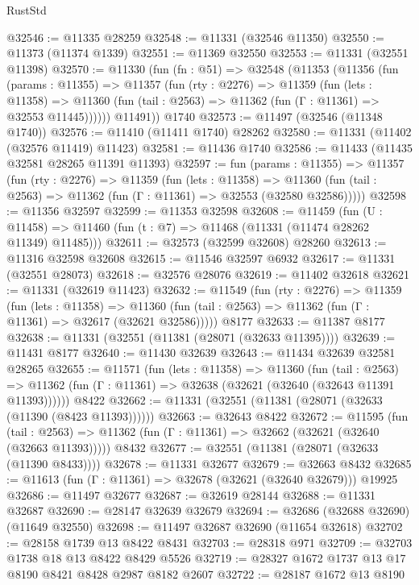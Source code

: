 \begin{lexlean}{RustStd}
\begin{coremodule}
@32546 := @11335 @28259
@32548 := @11331 (@32546 @11350)
@32550 := @11373 (@11374 @1339)
@32551 := @11369 @32550
@32553 := @11331 (@32551 @11398)
@32570 := @11330
    (fun (fn : @51) =>
    @32548
      (@11353
        (@11356
          (fun (params : @11355) =>
          @11357
            (fun (rty : @2276) =>
            @11359
              (fun (lets : @11358) =>
              @11360 (fun (tail : @2563) => @11362 (fun (Γ : @11361) => @32553 @11445))))))
        @11491))
    @1740
@32573 := @11497 (@32546 (@11348 @1740))
@32576 := @11410 (@11411 @1740) @28262
@32580 := @11331 (@11402 (@32576 @11419) @11423)
@32581 := @11436 @1740
@32586 := @11433 (@11435 @32581 @28265 @11391 @11393)
@32597 := fun (params : @11355) =>
  @11357
    (fun (rty : @2276) =>
    @11359
      (fun (lets : @11358) =>
      @11360 (fun (tail : @2563) => @11362 (fun (Γ : @11361) => @32553 (@32580 @32586)))))
@32598 := @11356 @32597
@32599 := @11353 @32598
@32608 := @11459
    (fun (U : @11458) => @11460 (fun (t : @7) => @11468 (@11331 (@11474 @28262 @11349) @11485)))
@32611 := @32573 (@32599 @32608) @28260
@32613 := @11316 @32598 @32608
@32615 := @11546 @32597 @6932
@32617 := @11331 (@32551 @28073)
@32618 := @32576 @28076
@32619 := @11402 @32618
@32621 := @11331 (@32619 @11423)
@32632 := @11549
    (fun (rty : @2276) =>
    @11359
      (fun (lets : @11358) =>
      @11360 (fun (tail : @2563) => @11362 (fun (Γ : @11361) => @32617 (@32621 @32586)))))
    @8177
@32633 := @11387 @8177
@32638 := @11331 (@32551 (@11381 (@28071 (@32633 @11395))))
@32639 := @11431 @8177
@32640 := @11430 @32639
@32643 := @11434 @32639 @32581 @28265
@32655 := @11571
    (fun (lets : @11358) =>
    @11360
      (fun (tail : @2563) =>
      @11362 (fun (Γ : @11361) => @32638 (@32621 (@32640 (@32643 @11391 @11393))))))
    @8422
@32662 := @11331 (@32551 (@11381 (@28071 (@32633 (@11390 (@8423 @11393))))))
@32663 := @32643 @8422
@32672 := @11595
    (fun (tail : @2563) => @11362 (fun (Γ : @11361) => @32662 (@32621 (@32640 (@32663 @11393)))))
    @8432
@32677 := @32551 (@11381 (@28071 (@32633 (@11390 @8433))))
@32678 := @11331 @32677
@32679 := @32663 @8432
@32685 := @11613 (fun (Γ : @11361) => @32678 (@32621 (@32640 @32679))) @19925
@32686 := @11497 @32677
@32687 := @32619 @28144
@32688 := @11331 @32687
@32690 := @28147 @32639 @32679
@32694 := @32686 (@32688 @32690) (@11649 @32550)
@32698 := @11497 @32687 @32690 (@11654 @32618)
@32702 := @28158 @1739 @13 @8422 @8431
@32703 := @28318 @971
@32709 := @32703 @1738 @18 @13 @8422 @8429 @5526
@32719 := @28327 @1672 @1737 @13 @17 @8190 @8421 @8428 @2987 @8182 @2607
@32722 := @28187 @1672 @13 @8190

\end{coremodule}
\end{lexlean}
